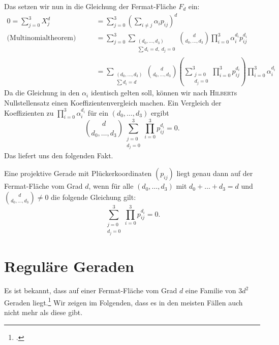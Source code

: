 Das setzen wir nun in die Gleichung der Fermat-Fläche $F_d$ ein:
\begin{align*}
0 = \sum_{j=0}^3 X_j^d &= \sum_{j=0}^3 \left(\sum_{i \neq j} \alpha_i p_{ij} \right)^d \\
\text{(Multinomialtheorem)}\qquad &= \sum_{j=0}^3 \sum_{\substack{(d_0,\dots,d_3) \\ \sum d_i=d,\;d_j=0}} \binom d{d_0,\dots,d_3} \prod_{i=0}^3 \alpha_i^{d_i} p_{ij}^{d_i} \\
	&= \sum_{\substack{(d_0,\dots,d_3) \\ \sum d_i=d}} \binom d{d_0,\dots,d_3} \left(\sum_{\substack{j=0 \\ d_j=0}}^3 \prod_{i=0}^3 p_{ij}^{d_i} \right) \prod_{i=0}^3 \alpha_i^{d_i}
\end{align*}
Da die Gleichung in den $\alpha_i$ identisch gelten soll, können wir nach \textsc{Hilbert}s Nullstellensatz einen Koeffizientenvergleich machen. Ein Vergleich der Koeffizienten zu $\prod_{i=0}^3 \alpha_i^{d_i}$ für ein $(d_0,\dots,d_3)$ ergibt
\begin{equation}
\binom d{d_0,\dots,d_3} \sum_{\substack{j=0 \\ d_j=0}}^3 \prod_{i=0}^3 p_{ij}^{d_i} = 0.
\end{equation}
Das liefert uns den folgenden Fakt.

\begin{fact}
Eine projektive Gerade mit Plückerkoordinaten $(p_{ij})$ liegt genau dann auf der Fermat-Fläche vom Grad $d$, wenn für alle $(d_0,\dots,d_3)$ mit $d_0 + \dots + d_3 = d$ und $\binom d{d_0,\dots,d_3} \neq 0$ die folgende Gleichung gilt:
\begin{equation}
\sum_{\substack{j=0 \\ d_j=0}}^3 \prod_{i=0}^3 p_{ij}^{d_i} = 0.
\end{equation}
\end{fact}

\section{Reguläre Geraden}
Es ist bekannt, dass auf einer Fermat-Fläche vom Grad $d$ eine Familie von $3d^2$ Geraden liegt.\footcite[siehe u.\,a.][S.~5]{LinesOnFermat} Wir zeigen im Folgenden, dass es in den meisten Fällen auch nicht mehr als diese gibt.

